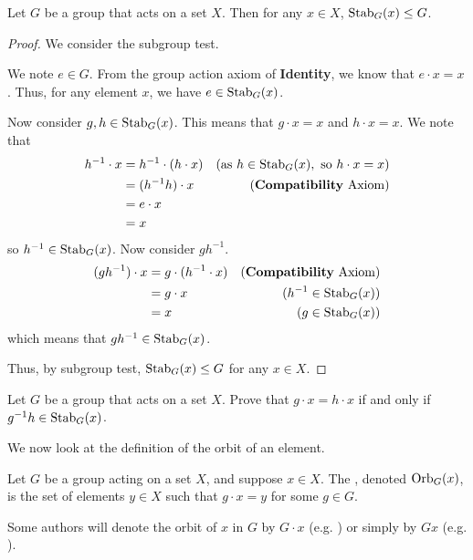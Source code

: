 \begin{lemma}\label{lemma-stabilizer-is-subgroup}
    Let $G$ be a group that acts on a set $X$. Then for any $x \in X$, $\mathrm{Stab}_{G}(x) \leq G$.
\end{lemma}
\begin{proof}
    We consider the subgroup test.

    We note $e \in G$. From the group action axiom of \textbf{Identity}, we know that $e \cdot x = x$. Thus, for any element $x$, we have $e \in \mathrm{Stab}_{G}(x)$.

    Now consider $g, h \in \mathrm{Stab}_{G}(x)$. This means that $g\cdot x = x$ and $h \cdot x = x$. We note that
    \begin{align*}
        h^{-1} \cdot x &= h^{-1} \cdot (h \cdot x) & (\text{as } h \in \mathrm{Stab}_{G}(x), \text{ so } h\cdot x = x)\\
        &= (h^{-1}h) \cdot x & (\text{\textbf{Compatibility} Axiom})\\
        &= e \cdot x\\
        &= x
    \end{align*}
    so $h^{-1} \in \mathrm{Stab}_{G}(x)$. Now consider $gh^{-1}$.
    \begin{align*}
        (gh^{-1}) \cdot x &= g \cdot (h^{-1} \cdot x) & (\text{\textbf{Compatibility} Axiom})\\
        &= g \cdot x & (h^{-1} \in \mathrm{Stab}_{G}(x))\\
        &= x & (g \in \mathrm{Stab}_{G}(x))
    \end{align*}
    which means that $gh^{-1} \in \mathrm{Stab}_{G}(x)$.

    Thus, by subgroup test, $\mathrm{Stab}_{G}(x) \leq G$ for any $x \in X$.
\end{proof}

\begin{exercise}\label{exercise-group-action-outputs-equal-iff-gh^-1-in-stabilizer}
    Let $G$ be a group that acts on a set $X$. Prove that $g \cdot x = h \cdot x$ if and only if $g^{-1}h \in \mathrm{Stab}_{G}(x)$.
\end{exercise}

We now look at the definition of the orbit of an element.
\begin{definition}
    Let $G$ be a group acting on a set $X$, and suppose $x \in X$. The , denoted $\mathrm{Orb}_{G}(x)$, is the set of elements $y \in X$ such that $g \cdot x = y$ for some $g \in G$.
\end{definition}
\begin{remark}
    Some authors will denote the orbit of $x$ in $G$ by $G \cdot x$ (e.g. {\cite[\S 54]{clark_1984}}) or simply by $Gx$ (e.g. {\cite[p.~58]{milne_2021}}).
\end{remark}

